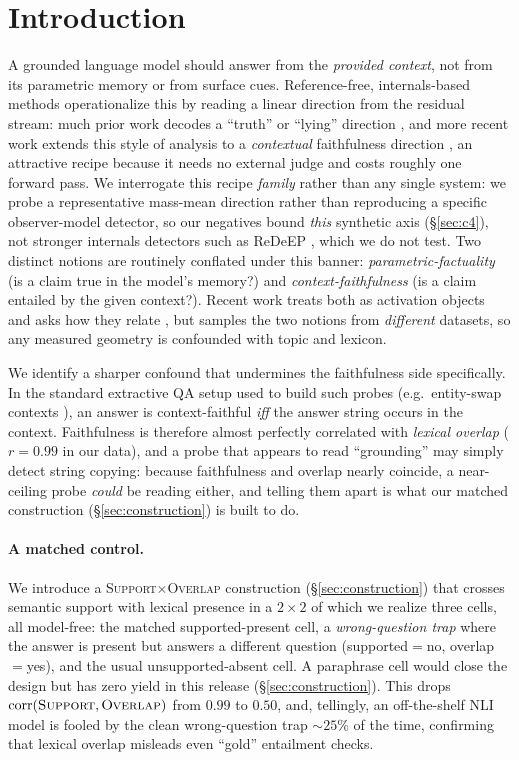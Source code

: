 \section{Introduction}
\label{sec:intro}

A grounded language model should answer from the \emph{provided context}, not from
its parametric memory or from surface cues. Reference-free, internals-based methods
operationalize this by reading a linear direction from the residual stream: much prior
work decodes a ``truth'' or ``lying'' direction
\citep{azaria2023saplma,marks2024geometry,burger2024truthuniversal}, and more recent
work extends this style of analysis to a \emph{contextual} faithfulness direction
\citep{oneill2025singledirection,gao2026proberag}, an attractive recipe because it needs no external
judge and costs roughly one forward pass. We interrogate this recipe \emph{family}
rather than any single system: we probe a representative mass-mean direction rather than
reproducing a specific observer-model detector, so our negatives bound \emph{this}
synthetic axis (\S\ref{sec:c4}), not stronger internals detectors such as ReDeEP
\citep{sun2025redeep}, which we do not test. Two distinct notions are routinely conflated under this banner:
\emph{parametric-factuality} (is a claim true in the model's memory?) and
\emph{context-faithfulness} (is a claim entailed by the given context?). Recent work
treats both as activation objects and asks how they relate \citep{wang2025space},
but samples the two notions from \emph{different} datasets, so any measured geometry
is confounded with topic and lexicon.

We identify a sharper confound that undermines the faithfulness side specifically.
In the standard extractive QA setup used to build such probes (e.g.\ entity-swap
contexts \citep{longpre2021nqswap}), an answer is context-faithful \emph{iff} the
answer string occurs in the context. Faithfulness is therefore almost perfectly
correlated with \emph{lexical overlap} ($r{=}0.99$ in our data), and a probe that
appears to read ``grounding'' may simply detect string copying: because faithfulness
and overlap nearly coincide, a near-ceiling probe \emph{could} be reading either, and
telling them apart is what our matched construction (\S\ref{sec:construction}) is built
to do.

\paragraph{A matched control.}
We introduce a \textsc{Support}$\times$\textsc{Overlap} construction
(\S\ref{sec:construction}) that crosses semantic support with lexical presence in a
$2\times2$ of which we realize three cells, all model-free: the matched
supported-present cell, a \emph{wrong-question trap} where the answer is present but
answers a different question (supported${=}$no, overlap${=}$yes), and the usual
unsupported-absent cell. A paraphrase cell would close
the design but has zero yield in this release (\S\ref{sec:construction}). This drops $\mathrm{corr}(\textsc{Support},\textsc{Overlap})$ from
$0.99$ to $0.50$, and, tellingly, an off-the-shelf NLI model is fooled by the
clean wrong-question trap ${\sim}25\%$ of the time, confirming that lexical overlap
misleads even ``gold'' entailment checks.

